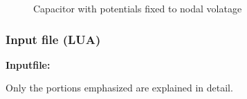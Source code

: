 \begin{figure}[htbp]
\begin{minipage}{0.3\linewidth}
\caption{Capacitor with potentials fixed to nodal volatage}
\end{minipage}
\end{figure}

\clearpage
\subsubsection*{Input file (LUA)}
\begin{flushleft}
  \textbf{Inputfile:}
  \\
\end{flushleft}
\hspace{1in}
{\footnotesize
{}
}

\clearpage
Only the portions emphasized are explained in detail.

